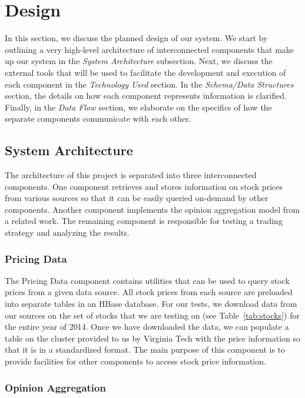 
\section{Design}

In this section, we discuss the planned design of our system. We start by outlining a very high-level architecture of interconnected components that make up our system in the \textit{System Architecture} subsection. Next, we discuss the external tools that will be used to facilitate the development and execution of each component in the \textit{Technology Used} section. In the \textit{Schema/Data Structures} section, the details on how each component represents information is clarified. Finally, in the \textit{Data Flow} section, we elaborate on the specifics of how the separate components communicate with each other.

\subsection{System Architecture}

The architecture of this project is separated into three interconnected components. One component retrieves and stores information on stock prices from various sources so that it can be easily queried on-demand by other components. Another component implements the opinion aggregation model from a related work. The remaining component is responsible for testing a trading strategy and analyzing the results.

\subsubsection{Pricing Data}

The Pricing Data component contains utilities that can be used to query stock prices from a given data source. All stock prices from each source are preloaded into separate tables in an HBase \cite{hbase} database. For our tests, we download data from our sources on the set of stocks that we are testing on (see Table~\ref{tab:stocks}) for the entire year of 2014. Once we have downloaded the data, we can populate a table on the cluster provided to us by Virginia Tech with the price information so that it is in a standardized format. The main purpose of this component is to provide facilities for other components to access stock price information.

\subsubsection{Opinion Aggregation}

